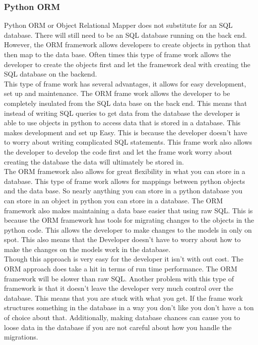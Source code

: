 \documentclass[letterpaper,10pt]{article}
\begin{document}
		\subsubsection{Python ORM}
				Python ORM or Object Relational Mapper does not substitute for an SQL database. There will still need to be an SQL database running on the back end. However, the ORM framework allows developers to create objects in python that then map to the data base. Often times this type of frame work allows the developer to create the objects first and let the framework deal with creating the SQL database on the backend.\\
				This type of frame work has several advantages, it allows for easy development, set up and maintenance. The ORM frame work allows the developer to be completely insulated from the SQL data base on the back end. This means that instead of writing SQL queries to get data from the database the developer is able to use objects in python to access data that is stored in a database. This makes development and set up Easy. This is because the developer doesn't have to worry about writing complicated SQL statements. This frame work also allows the developer to develop the code first and let the frame work worry about creating the database the data will ultimately be stored in.\\
				The ORM framework also allows for great flexibility in what you can store in a database. This type of frame work allows for mappings between python objects and the data base. So nearly anything you can store in a python database you can store in an object in python you can store in a database.
				The ORM framework also makes maintaining a data base easier that using raw SQL. This is because the ORM framework has tools for migrating changes to the objects in the python code. This allows the developer to make changes to the models in only on spot. This also means that the Developer doesn't have to worry about how to make the changes on the models work in the database.\\
				Though this approach is very easy for the developer it isn't with out cost. The ORM approach does take a hit in terms of run time performance. The ORM framework will be slower than raw SQL. Another problem with this type of framework is that it doesn’t leave the developer very much control over the database. This means that you are stuck with what you get. If the frame work structures something in the database in a way you don't like you don't have a ton of choice about that. Additionally, making database chances can cause you to loose data in the database if you are not careful about how you handle the migrations.\\
				
\end{document}
